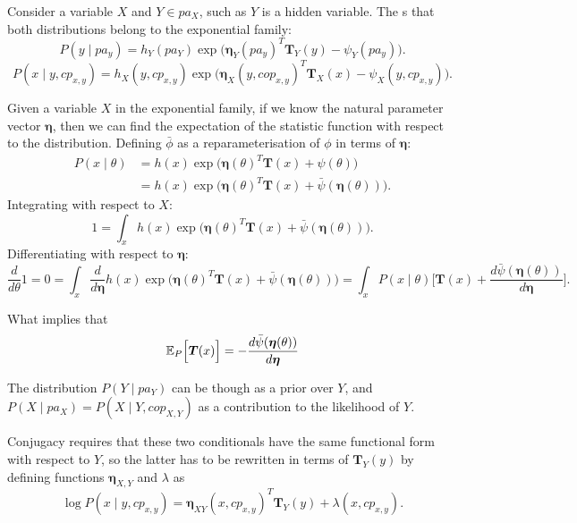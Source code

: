 Consider a variable \( X \) and \( Y \in pa_X \), such as \( Y \) is a hidden variable. The s that both distributions belong to the exponential family:
\[
     P(y \mid pa_y) = h_Y(pa_Y)\exp \Big( {\bm{\eta}_Y(pa_y)}^T\bm{T}_Y(y) - \psi_Y(pa_y) \Big).
\]
\[
P(x \mid y,cp_{x,y}) = h_X(y, cp_{x,y})\exp \Big( {\bm{\eta}_X(y, cop_{x,y})}^T\bm{T}_X(x) - \psi_X(y, cp_{x,y}) \Big).
\]

\begin{remark}
  Given a variable \(X\) in the exponential family, if we know the natural parameter vector \(\bm{\eta}\), then we can find the expectation of the statistic function with respect to the distribution. Defining \(\bar{\phi}\) as a reparameterisation of \(\phi\) in terms of \(\bm{\eta}\):
  \[
    \begin{aligned}
      P(x\mid \theta) &= h(x)\exp \Big( \bm{\eta}(\theta)^{T}\bm{T}(x) + \psi(\theta) \Big)\\
       &= h(x)\exp \Big( \bm{\eta}(\theta)^{T}\bm{T}(x) + \bar{\psi}(\bm{\eta}(\theta)) \Big).
    \end{aligned}
  \]
  Integrating with respect to \(X\):
  \[
    1 = \int_{x} h(x)\exp \Big( \bm{\eta}(\theta)^{T}\bm{T}(x) + \bar{\psi}(\bm{\eta}(\theta)) \Big).
  \]
  Differentiating with respect to \(\bm{\eta}\):
  \[
    \frac{d}{d\theta}1 = 0 = \int_{x} \frac{d}{d\bm{\eta}}h(x)\exp \Big( \bm{\eta}(\theta)^{T}\bm{T}(x) + \bar{\psi}(\bm{\eta}(\theta)) \Big) = \int_{x}P(x \mid \theta)\Big[ \bm{T}(x) + \frac{ d\bar{\psi}(\bm{\eta}(\theta)) }{d \bm{\eta}}\Big].
  \]

  What implies that
  \[
    \mathbb{E}_{P}\Big[\bm{T}(x)\Big] =   -  \frac{ d\bar{\psi}(\bm{\eta}(\theta)) }{d \bm{\eta}}
  \]

\end{remark}

The distribution \( P(Y \mid pa_Y) \) can be though as a prior over \( Y \), and \( P(X \mid pa_X) = P(X \mid Y, cop_{X,Y})\) as a contribution to the likelihood of \( Y \).

Conjugacy requires that these two conditionals have the same functional form with respect to \( Y \), so the latter has to be rewritten in terms of \( \bm{T}_Y (y)\) by defining functions \( \bm{\eta}_{X,Y} \) and \( \lambda \) as
\[
     \log P(x \mid y , cp_{x,y}) = \bm{\eta}_{XY}(x, cp_{x,y})^T \bm{T}_Y(y) + \lambda(x, cp_{x,y}).
\]

